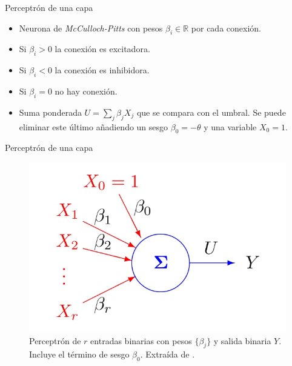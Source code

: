 \documentclass[spanish]{beamer}
\begin{document}
\begin{frame}{Perceptrón de una capa}
  \begin{itemize}
    \item Neurona de \textit{McCulloch-Pitts} con pesos $\beta_i \in \mathbb{R}$ por cada conexión.
    \item Si $\beta_i > 0$ la conexión es excitadora.
    \item Si $\beta_i < 0$ la conexión es inhibidora.
    \item Si  $\beta_i = 0$ no hay conexión.
    \item Suma ponderada $U = \sum_j \beta_j X_j$ que se compara con el umbral. Se puede eliminar este último añadiendo un sesgo $\beta_0 = - \theta$ y una variable $X_0 = 1$.
  \end{itemize}
\end{frame}

\begin{frame}{Perceptrón de una capa}
  \begin{figure}[h]
    \centering
    \includegraphics[width=.7\textwidth]{img/perceptron}
    \caption{Perceptrón de $r$ entradas binarias con pesos $\{\beta_j\}$ y salida binaria $Y$. Incluye el término de sesgo $\beta_0$. Extraída de \parencite{izenman_modern_2008}.}
    \label{fig:perceptron}
  \end{figure}
\end{frame}
\end{document}
